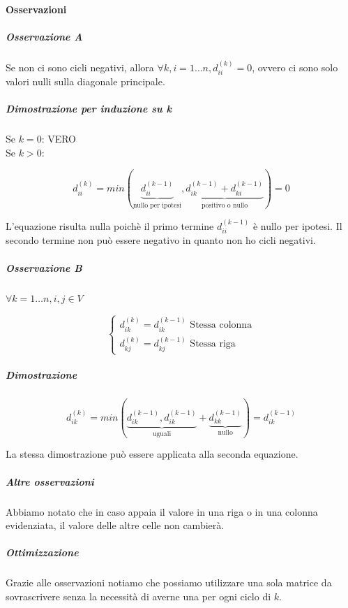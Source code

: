 \documentclass[11pt,a4paper,twoside,openright]{book}
\let\oldparagraph\paragraph
\renewcommand{\paragraph}[1]{\oldparagraph{#1}\mbox{}}
\let\oldsubparagraph\subparagraph
\renewcommand{\subparagraph}[1]{\oldsubparagraph{#1}\mbox{}}
\begin{document}
{{\paragraph{Osservazioni}

\subparagraph{Osservazione A}

Se non ci sono cicli negativi, allora $\forall k,i = 1\ldots n, d_{ii}^{(k)} = 0$, ovvero ci sono solo valori nulli sulla diagonale principale.

\subparagraph{Dimostrazione per induzione su k}

Se $k=0$: VERO \\ 
Se $k>0$: 

\begin{equation}
d_{ii}^{(k)} = min( \underbrace{d_{ii}^{(k-1)}}_\text{nullo per ipotesi} ,  \underbrace{d_{ik}^{(k-1)} + d_{ki}^{(k-1)}}_\text{positivo o nullo} ) = 0
\end{equation}

L'equazione risulta nulla poichè il primo termine $d_{ii}^{(k-1)}$ è nullo per ipotesi.
Il secondo termine non può essere negativo in quanto non ho cicli negativi.


\subparagraph{Osservazione B}

$\forall k = 1\ldots n,i,j \in V$

\[
\begin{cases} d_{ik}^{(k)} = d_{ik}^{(k-1)} \mbox{ Stessa colonna} \\ d_{kj}^{(k)} = d_{kj}^{(k-1)} \mbox{ Stessa riga} \end{cases}
\]


\subparagraph{Dimostrazione}

\begin{equation}
d_{ik}^{(k)} = min(  \underbrace{ d_{ik}^{(k-1)} , d_{ik}^{(k-1)}  }_\text{uguali} + \underbrace{ d_{kk}^{(k-1)} }_\text{nullo} ) = d_{ik}^{(k-1)}
\end{equation}

La stessa dimostrazione può essere applicata alla seconda equazione.

\subparagraph{Altre osservazioni}
Abbiamo notato che in caso appaia il valore \infty in una riga o in una colonna evidenziata, il valore delle altre celle non cambierà.


\subparagraph{Ottimizzazione}

Grazie alle osservazioni notiamo che possiamo utilizzare una sola matrice da sovrascrivere senza la necessità di averne una per ogni ciclo di $k$.




}}
\end{document}
